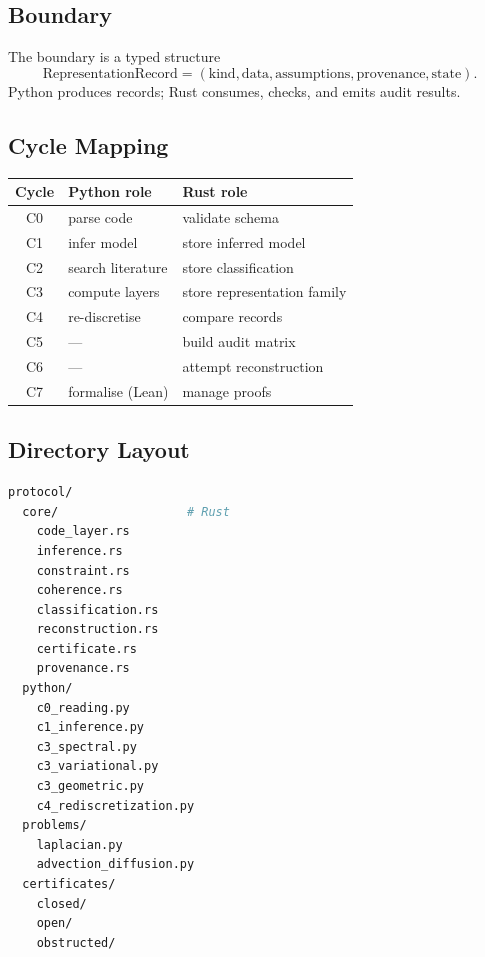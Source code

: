 \documentclass[11pt,a4paper]{article}
\theoremstyle{definition}
\theoremstyle{plain}
\begin{document}
\subsection{Boundary}

The boundary is a typed structure
\[
  \mathrm{RepresentationRecord} = (\text{kind}, \text{data},
    \text{assumptions}, \text{provenance}, \text{state}).
\]
Python produces records; Rust consumes, checks, and emits audit
results.

\subsection{Cycle Mapping}

\begin{center}
\begin{tabular}{c l l}
  \toprule
  Cycle & Python role & Rust role \\
  \midrule
  C0 & parse code & validate schema \\
  C1 & infer model & store inferred model \\
  C2 & search literature & store classification \\
  C3 & compute layers & store representation family \\
  C4 & re-discretise & compare records \\
  C5 & --- & build audit matrix \\
  C6 & --- & attempt reconstruction \\
  C7 & formalise (Lean) & manage proofs \\
  \bottomrule
\end{tabular}
\end{center}

\subsection{Directory Layout}

\begin{lstlisting}[language=bash]
protocol/
  core/                  # Rust
    code_layer.rs
    inference.rs
    constraint.rs
    coherence.rs
    classification.rs
    reconstruction.rs
    certificate.rs
    provenance.rs
  python/
    c0_reading.py
    c1_inference.py
    c3_spectral.py
    c3_variational.py
    c3_geometric.py
    c4_rediscretization.py
  problems/
    laplacian.py
    advection_diffusion.py
  certificates/
    closed/
    open/
    obstructed/
\end{lstlisting}
\end{document}
